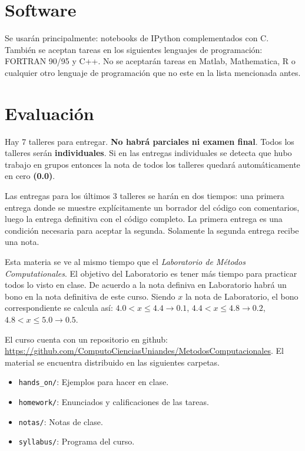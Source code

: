 \documentclass[11pt]{article}
\begin{document}
\section*{Software}
\noindent Se usar\'an principalmente: notebooks de IPython
complementados con  C. Tambi\'en se aceptan tareas en los siguientes
lenguajes de programaci\'on: FORTRAN 90/95 y C++. No se
aceptar\'an tareas en Matlab, Mathematica, R o cualquier otro lenguaje 
de programaci\'on que no este en la lista mencionada antes. 

\section*{Evaluaci\'on}

Hay 7 talleres para entregar. \textbf{No habr\'a parciales ni
examen final}. Todos los talleres ser\'an \textbf{individuales}. 
Si en las entregas
individuales se detecta que hubo trabajo en grupos entonces la nota de
todos los talleres quedar\'a autom\'aticamente en cero
\textbf{(0.0)}.  

Las entregas para los \'ultimos 3 talleres se har\'an en dos tiempos:
una primera entrega donde se muestre expl\'icitamente un borrador del
c\'odigo con comentarios, luego la entrega definitiva con el c\'odigo
completo. La primera entrega es una condici\'on necesaria para aceptar
la segunda. Solamente la segunda entrega recibe una nota. 

Esta materia se ve al mismo tiempo que el \emph{Laboratorio de M\'etodos
Computationales}. El objetivo del Laboratorio es tener m\'as tiempo
para practicar todos lo visto en clase. De acuerdo a la
nota definiva en Laboratorio habr\'a un bono en la nota definitiva de
este curso. Siendo $x$ la nota de Laboratorio, el bono correspondiente
se calcula as\'i:
$4.0 < x \leq 4.4 \rightarrow 0.1$, $4.4< x\leq 4.8\rightarrow 0.2$, $4.8<x
\leq 5.0\rightarrow 0.5$.


El curso cuenta con un repositorio en github:
\url{https://github.com/ComputoCienciasUniandes/MetodosComputacionales}. El material se
encuentra distribuido en las siguientes carpetas. 


\begin{itemize}
\item \texttt{hands\_on/}: Ejemplos para hacer en clase.
\item \texttt{homework/}: Enunciados y calificaciones de las tareas.
\item \texttt{notas/}: Notas de clase.
\item \texttt{syllabus/}: Programa del curso.
\end{itemize}
 
\end{document}
